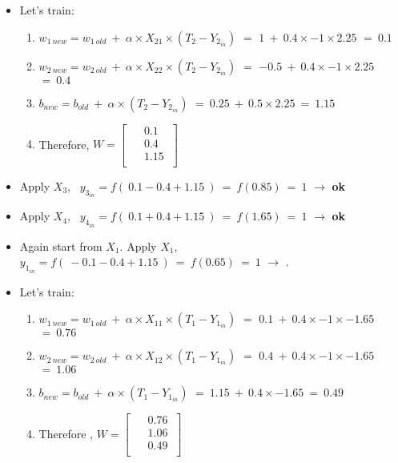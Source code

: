 \documentclass[12pt]{article}
\begin{document}
\begin{itemize}
	\item Let's train:
	{
		\begin{enumerate}
			
			\item $w_{1\ new} = w_{1\ old}\ +\ \alpha \times X_{21} \times (T_2 - Y_{2_{in}}) $ $=$ $1\ +\ 0.4 \times -1 \times 2.25$ $=\ 0.1$
			\item $w_{2\ new} = w_{2\ old}\ +\ \alpha \times X_{22} \times (T_2 - Y_{2_{in}}) $ $=$ $-0.5\ +\ 0.4 \times -1 \times 2.25$ $=\ 0.4$
			\item $b_{new} = b_{old} \ + \ \alpha \times (T_2 - Y_{2_{in}})$ $=\ 0.25 \ + \ 0.5 \times 2.25 \ = \ 1.15$
			\BlankLine
			\item Therefore, $ W = \begin{bmatrix}
				\phantom{-}0.1\ \\ 	
				\phantom{-}0.4\ \\ 	
				\phantom{-}1.15\ \\ 
			\end{bmatrix}$
		\end{enumerate}
	}
	\BlankLine
	\item Apply $X_3$, \  $y_{3_{in}} = f(\ 0.1 - 0.4 + 1.15\ ) \ = \ f(0.85) \ = \ 1 $ $\rightarrow$ \textbf{ok}
	
	\item Apply $X_4$, \  $y_{4_{in}}= f(\ 0.1 + 0.4 + 1.15\ ) \ = \ f(1.65) \ = \ 1 $ $\rightarrow$ \textbf{ok}
	
	\item Again start from $X_1$. Apply $X_1$, \  $y_{1_{in}} = f(\ -0.1 - 0.4 + 1.15\ ) \ = \ f(0.65) \ = \ 1 $ $\rightarrow$ .
	
	\item Let's train:
	{
		\begin{enumerate}
			
			\item $w_{1\ new} = w_{1\ old}\ +\ \alpha \times X_{11} \times (T_1 - Y_{1_{in}}) $ $=$ $0.1\ +\ 0.4 \times -1 \times -1.65$ $=\ 0.76$
			\item $w_{2\ new} = w_{2\ old}\ +\ \alpha \times X_{12} \times (T_1 - Y_{1_{in}}) $ $=$ $0.4\ +\ 0.4 \times -1 \times -1.65$ $=\ 1.06$
			\item $b_{new} = b_{old} \ + \ \alpha \times (T_1 - Y_{1_{in}})$ $=\ 1.15 \ + \ 0.4 \times -1.65 \ = \ 0.49$
			\BlankLine
			\item Therefore , $ W = \begin{bmatrix}
				\phantom{-}0.76\ \\ 	
				\phantom{-}1.06\ \\ 	
				\phantom{-}0.49\ \\ 
			\end{bmatrix}$
		\end{enumerate}
	}
	

\end{itemize}
\end{document}
